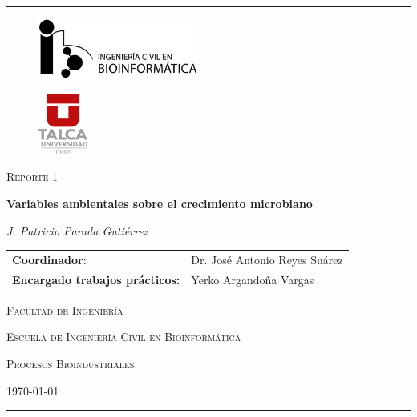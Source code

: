 \documentclass[a4paper,12pt]{article}
\begin{document}
  \begin{titlepage}
    \centering
    \rule[1ex]{\textwidth}{0.8pt}

    \vspace{1cm}
    \begin{minipage}[b]{.45\linewidth}
      \begin{figure}[H]
        \raggedright
        \includegraphics[height=2.0cm]{icb_logo}
      \end{figure}
    \end{minipage}
    \begin{minipage}[b]{.45\linewidth}
      \begin{figure}[H]
        \raggedleft
        \includegraphics[height=2.0cm]{utalca_logo}
      \end{figure}
    \end{minipage}

    \vspace{2cm}

    {\large \scshape Reporte 1 \par}
    \vspace{1cm}
    {\Large \bfseries Variables ambientales sobre el crecimiento microbiano \par}
    \vspace{2cm}
    {\itshape J. Patricio Parada Gutiérrez \par}
    \vspace{2cm}

    \begin{tabular}{ll}
      \textbf{Coordinador}: & Dr. José Antonio Reyes Suárez \\
      \textbf{Encargado trabajos prácticos:} & Yerko Argandoña Vargas \\
    \end{tabular}

    \vfill
    {\scshape Facultad de Ingeniería \par}
    {\scshape Escuela de Ingeniería Civil en Bioinformática \par}
    {\scshape Procesos Bioindustriales \par}

    \vfill
    {\scshape \today \par}

    \vfill
    \rule{\textwidth}{0.8pt}

  \end{titlepage}
\end{document}
